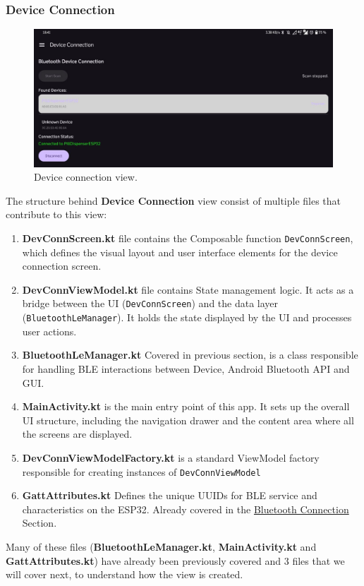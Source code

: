 \subsubsection{Device Connection}
\begin{figure}[h!]
	\centering
	\includegraphics[width=0.8\linewidth]{Figures/devConnView}
	\caption[Device connection view.]{Device connection view.}
	\label{fig:devconnview}
\end{figure}
The structure behind \textbf{Device Connection} view consist of multiple files that contribute to this view:
\begin{enumerate}
	\item \textbf{DevConnScreen.kt} file contains the Composable function \texttt{DevConnScreen}, which defines the visual layout and user interface elements for the device connection screen.
	\item \textbf{DevConnViewModel.kt} file contains State management logic. It acts as a bridge between the UI (\texttt{DevConnScreen}) and the data layer (\texttt{BluetoothLeManager}). It holds the state displayed by the UI and processes user actions.
	\item \textbf{BluetoothLeManager.kt} Covered in previous section, is a class responsible for handling \ac{BLE} interactions between Device, Android Bluetooth \ac{API} and \ac{GUI}.
	\item \textbf{MainActivity.kt} is the main entry point of this app. It sets up the overall UI structure, including the navigation drawer and the content area where all the screens are displayed.
	\item \textbf{DevConnViewModelFactory.kt} is a standard ViewModel factory responsible for creating instances of \texttt{DevConnViewModel}
	\item \textbf{GattAttributes.kt} Defines the unique UUIDs for \ac{BLE} service and characteristics on the ESP32. Already covered in the \hyperref[subsec:Bluetooth]{Bluetooth Connection} Section.
\end{enumerate}
Many of these files (\textbf{BluetoothLeManager.kt}, \textbf{MainActivity.kt} and \textbf{GattAttributes.kt}) have already been previously covered and 3 files that we will cover next, to understand how the view is created.
